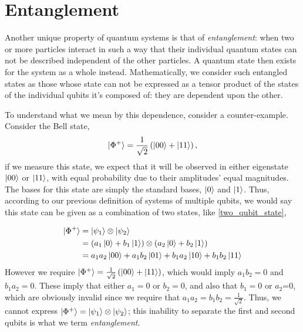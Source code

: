 \section{Entanglement}\label{sec:entanglement}
Another unique property of quantum systems is that of \emph{entanglement}: 
    when two or more particles interact in such a way that their individual quantum states can not be described independent of the other particles. 
A quantum state then exists for the system as a whole instead. 
Mathematically, we consider such entangled states as those whose state can not be expressed as a tensor product of the states of the individual qubits it's composed of: they are dependent upon the other. 
\par
To understand what we mean by this dependence, consider a counter-example. 
Consider the Bell state,
\begin{equation}
    \ket{\Phi^{+}} = \frac{1}{\sqrt{2}} \left( \ket{00} + \ket{11} \right),
\end{equation}
if we measure this state, we expect that it will be observed in either eigenstate $\ket{00} $ or $ \ket{11}$, 
    with equal probability due to their amplitudes' equal magnitudes. 
The bases for this state are simply the standard bases, $\ket{0}$ and $\ket{1}$. 
Thus, according to our previous definition of systems of multiple qubits, we would say this state can be given as a combination of two states, like \cref{two_qubit_state}, 

\begin{equation}
    \begin{split}
        \ket{\Phi^{+}} &= \ket{\psi_1} \otimes \ket{\psi_2} 
        \\ &=  \left( a_1 \ket{0} + b_1 \ket{1} \right) \otimes \left( a_2 \ket{0} + b_2 \ket{1} \right)
        \\ &= a_1a_2 \ket{00} + a_1b_2 \ket{01} + b_1a_2 \ket{10} + b_1b_2\ket{11} 
    \end{split}
\end{equation}
However we require $\ket{\Phi^{+}} = \frac{1}{\sqrt{2}} \left( \ket{00} + \ket{11} \right) $, 
    which would imply $a_1b_2 = 0$ and $b_1a_2 = 0$. 
These imply that either $a_1 =0$ or $b_2=0$, and also that $b_1=0$ or $a_2$=0, which are obviously invalid since we require that $a_1a_2 = b_1b_2 = \frac{1}{\sqrt{2}} $. 
Thus, we cannot express $ |\Phi^+ \rangle=  \ket{\psi_1} \otimes \ket{\psi_2} $;
    this inability to separate the first and second qubits is what we term \emph{entanglement}. 

